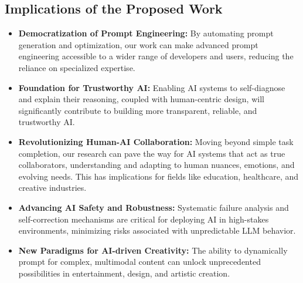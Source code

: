 \documentclass{article}
\begin{document}
\subsection{Implications of the Proposed Work}
\begin{itemize}
    \item \textbf{Democratization of Prompt Engineering:} By automating prompt generation and optimization, our work can make advanced prompt engineering accessible to a wider range of developers and users, reducing the reliance on specialized expertise.
    \item \textbf{Foundation for Trustworthy AI:} Enabling AI systems to self-diagnose and explain their reasoning, coupled with human-centric design, will significantly contribute to building more transparent, reliable, and trustworthy AI.
    \item \textbf{Revolutionizing Human-AI Collaboration:} Moving beyond simple task completion, our research can pave the way for AI systems that act as true collaborators, understanding and adapting to human nuances, emotions, and evolving needs. This has implications for fields like education, healthcare, and creative industries.
    \item \textbf{Advancing AI Safety and Robustness:} Systematic failure analysis and self-correction mechanisms are critical for deploying AI in high-stakes environments, minimizing risks associated with unpredictable LLM behavior.
\item \textbf{New Paradigms for AI-driven Creativity:} The ability to dynamically prompt for complex, multimodal content can unlock unprecedented possibilities in entertainment, design, and artistic creation.
\end{itemize}
\end{document}

